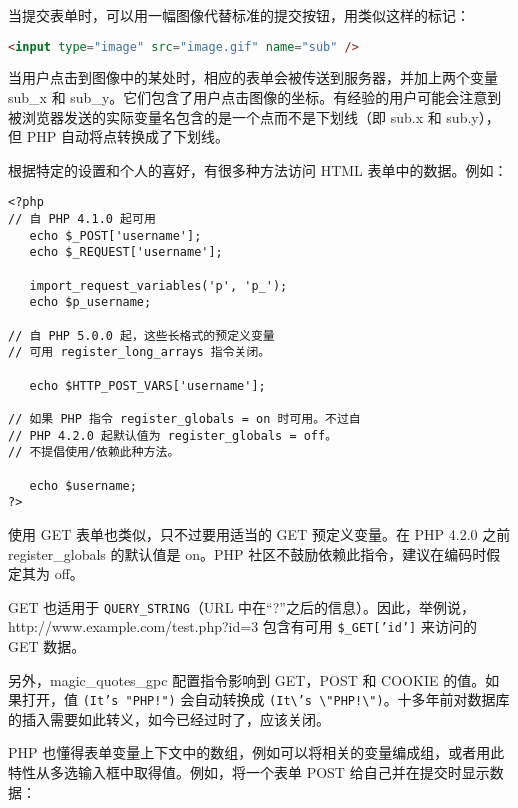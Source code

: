 当提交表单时，可以用一幅图像代替标准的提交按钮，用类似这样的标记：
\begin{lstlisting}[language=HTML]
<input type="image" src="image.gif" name="sub" />
\end{lstlisting}

当用户点击到图像中的某处时，相应的表单会被传送到服务器，并加上两个变量 sub\_x 和 sub\_y。它们包含了用户点击图像的坐标。有经验的用户可能会注意到被浏览器发送的实际变量名包含的是一个点而不是下划线（即 sub.x 和 sub.y），但 PHP 自动将点转换成了下划线。




根据特定的设置和个人的喜好，有很多种方法访问 HTML 表单中的数据。例如：

\begin{verbatim}
<?php
// 自 PHP 4.1.0 起可用
   echo $_POST['username'];
   echo $_REQUEST['username'];
   
   import_request_variables('p', 'p_');
   echo $p_username;

// 自 PHP 5.0.0 起，这些长格式的预定义变量
// 可用 register_long_arrays 指令关闭。

   echo $HTTP_POST_VARS['username'];

// 如果 PHP 指令 register_globals = on 时可用。不过自
// PHP 4.2.0 起默认值为 register_globals = off。
// 不提倡使用/依赖此种方法。

   echo $username;
?>
\end{verbatim}

使用 GET 表单也类似，只不过要用适当的 GET 预定义变量。在 PHP 4.2.0 之前 register\_globals 的默认值是 on。PHP 社区不鼓励依赖此指令，建议在编码时假定其为 off。


GET 也适用于 \texttt{QUERY\_STRING}（URL 中在“?”之后的信息）。因此，举例说，http://www.example.com/test.php?id=3 包含有可用 \texttt{\$\_GET['id']} 来访问的 GET 数据。

另外，magic\_quotes\_gpc 配置指令影响到 GET，POST 和 COOKIE 的值。如果打开，值 \texttt{(It's "PHP!")} 会自动转换成 \texttt{(It\textbackslash 's \textbackslash "PHP!\textbackslash ")}。十多年前对数据库的插入需要如此转义，如今已经过时了，应该关闭。


PHP 也懂得表单变量上下文中的数组，例如可以将相关的变量编成组，或者用此特性从多选输入框中取得值。例如，将一个表单 POST 给自己并在提交时显示数据：

